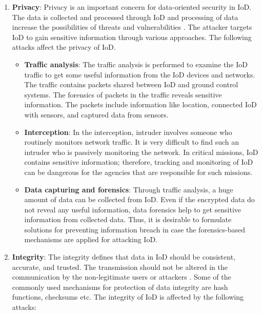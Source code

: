 \documentclass{easychair}
\begin{document}
\begin{enumerate}
\item
\textbf{Privacy}:  Privacy is an important concern for data-oriented security in IoD. The data is collected and processed through IoD and processing of data increase the possibilities of threats and vulnerabilities \cite{pauner2015drones}. The attacker targets IoD to gain sensitive information through various approaches. The following attacks affect the privacy of IoD.
 \begin{itemize}
 \item \textbf{Traffic analysis}: The traffic analysis is performed to examine the IoD traffic to get some useful information from the IoD devices and networks.  The traffic contains packets shared between IoD and ground control systems. The forensics of packets in the traffic reveals sensitive information. The packets include information like location, connected IoD with sensors, and captured data from sensors.
 \end{itemize}

  \begin{itemize}
  \item \textbf{Interception}: In the interception, intruder involves someone who routinely monitors network traffic. It is very difficult to find such an intruder who is passively monitoring the network. In critical missions, IoD contains sensitive information; therefore, tracking and monitoring of IoD can be dangerous for the agencies that are responsible for such missions.
   \end{itemize}
 \begin{itemize}
   \item \textbf{Data capturing and forensics}: Through traffic analysis, a huge amount of data can be collected from IoD. Even if the encrypted data do not reveal any useful information, data forensics help to get sensitive information from collected data. Thus, it is desirable to formulate solutions for preventing information breach in case the forensics-based mechanisms are applied for attacking IoD.
 \end{itemize}


  \item
   \textbf{Integrity}: The integrity defines that data in IoD should be consistent, accurate, and trusted. The transmission should not be altered in the communication by the non-legitimate users or attackers \cite{hartmann2013vulnerability}. Some of the commonly used mechanisms for protection of data integrity are hash functions, checksums etc. The integrity of IoD is affected by the following attacks:


\end{enumerate}
\end{document}

